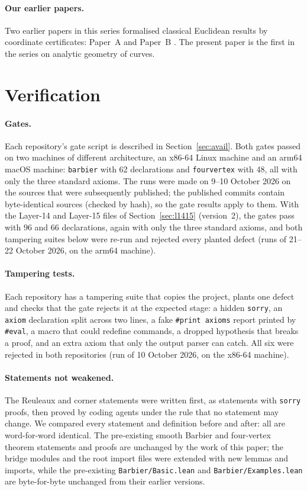 \documentclass[11pt]{article}
\theoremstyle{definition}
\theoremstyle{remark}
\newcommand{\lean}[1]{\texttt{#1}}
\begin{document}
\paragraph{Our earlier papers.} Two earlier papers in this series formalised classical Euclidean
results by coordinate certificates: Paper~A \cite{paperA} and Paper~B \cite{paperB}. The present paper is the first in the series on
analytic geometry of curves.

\section{Verification}\label{sec:verify}

\paragraph{Gates.} Each repository's gate script is described in Section~\ref{sec:avail}. Both gates passed on two machines of different
architecture, an x86-64 Linux machine and an arm64 macOS machine: \lean{barbier} with 62 declarations
and \lean{fourvertex} with 48, all with only the three standard axioms. The runs were made on
9--10 October 2026 on the sources that were subsequently published; the published commits contain
byte-identical sources (checked by hash), so the gate results apply to them. With the Layer-14 and
Layer-15 files of Section~\ref{sec:l1415} (version~2), the gates pass with 96 and 66 declarations,
again with only the three standard axioms, and both tampering suites below were re-run and rejected
every planted defect (runs of 21--22 October 2026, on the arm64 machine).

\paragraph{Tampering tests.} Each repository has a tampering suite that copies the project, plants one
defect and checks that the gate rejects it at the expected stage: a hidden \lean{sorry}, an
\lean{axiom} declaration split across two lines, a fake \lean{\#print axioms} report printed by
\lean{\#eval}, a macro that could redefine commands, a dropped hypothesis that breaks a proof, and an
extra axiom that only the output parser can catch. All six were rejected in both repositories (run of 10 October 2026, on the x86-64 machine).

\paragraph{Statements not weakened.} The Reuleaux and corner statements were written first, as
statements with \lean{sorry} proofs, then proved by coding agents under the rule that no statement
may change. We compared every statement and definition before and after: all are word-for-word
identical. The pre-existing smooth Barbier and four-vertex theorem statements and proofs are
unchanged by the work of this paper; the bridge modules and the root import files were extended with
new lemmas and imports, while the pre-existing \lean{Barbier/Basic.lean} and \lean{Barbier/Examples.lean}
are byte-for-byte unchanged from their earlier versions.
\end{document}
